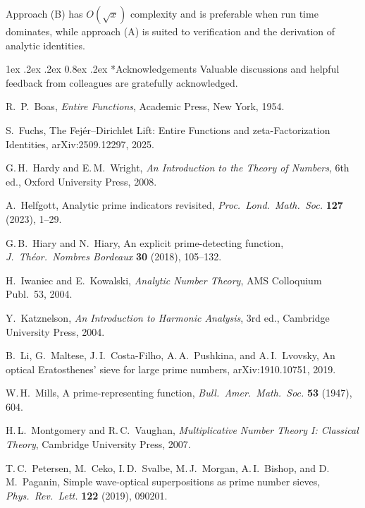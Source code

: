 \documentclass[11pt,a4paper]{amsart}
\makeatletter
\renewcommand\paragraph{\@startsection{paragraph}{4}{\z@}%
  {1ex \@plus .2ex \@minus .2ex}%
  {0.8ex \@plus .2ex}%
  {\normalfont\bfseries}}
\theoremstyle{plain}
\theoremstyle{definition}
\theoremstyle{remark}
\makeatother
\begin{document}
\smallskip
Approach (B) has $O(\sqrt{x})$ complexity and is preferable when run time dominates, while approach (A) is suited to verification and the derivation of analytic identities.

\paragraph*{Acknowledgements}
Valuable discussions and helpful feedback from colleagues are gratefully acknowledged.

\begin{thebibliography}{99}

R.~P.~Boas, \emph{Entire Functions}, Academic Press, New York, 1954.

S.~Fuchs, The Fej\'er--Dirichlet Lift: Entire Functions and zeta-Factorization Identities, arXiv:2509.12297, 2025.

G.\,H.~Hardy and E.\,M.~Wright, \emph{An Introduction to the Theory of Numbers}, 6th ed., Oxford University Press, 2008.

A.~Helfgott, Analytic prime indicators revisited, \emph{Proc.\ Lond.\ Math.\ Soc.} \textbf{127} (2023), 1–29.

G.\,B.~Hiary and N.~Hiary, An explicit prime-detecting function, \emph{J.\ Théor.\ Nombres Bordeaux} \textbf{30} (2018), 105–132.

H.~Iwaniec and E.~Kowalski, \emph{Analytic Number Theory}, AMS Colloquium Publ.\ 53, 2004.

Y.~Katznelson, \emph{An Introduction to Harmonic Analysis}, 3rd ed., Cambridge University Press, 2004.

B.~Li, G.~Maltese, J.\,I.~Costa-Filho, A.\,A.~Pushkina, and A.\,I.~Lvovsky,
An optical Eratosthenes' sieve for large prime numbers, arXiv:1910.10751, 2019.

W.\,H.~Mills, A prime-representing function, \emph{Bull.\ Amer.\ Math.\ Soc.} \textbf{53} (1947), 604.

H.\,L.~Montgomery and R.\,C.~Vaughan, \emph{Multiplicative Number Theory I: Classical Theory}, Cambridge University Press, 2007.

T.\,C.~Petersen, M.~Ceko, I.\,D.~Svalbe, M.\,J.~Morgan, A.\,I.~Bishop, and D.\,M.~Paganin,
Simple wave-optical superpositions as prime number sieves,
\emph{Phys.\ Rev.\ Lett.} \textbf{122} (2019), 090201.


\end{thebibliography}
\end{document}
